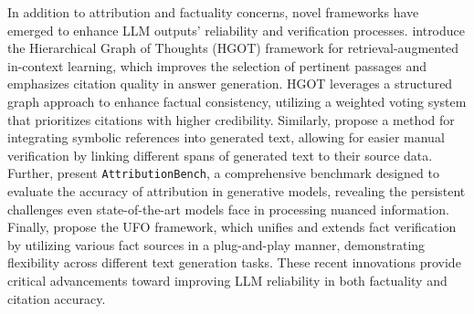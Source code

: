 In addition to attribution and factuality concerns, novel frameworks have emerged to enhance LLM outputs' reliability and verification processes. \cite{hgot2024} introduce the Hierarchical Graph of Thoughts (HGOT) framework for retrieval-augmented in-context learning, which improves the selection of pertinent passages and emphasizes citation quality in answer generation. HGOT leverages a structured graph approach to enhance factual consistency, utilizing a weighted voting system that prioritizes citations with higher credibility. Similarly, \cite{symbolic_references2023}\cite{feedback_learning2023}\cite{factscore2023} propose a method for integrating symbolic references into generated text, allowing for easier manual verification by linking different spans of generated text to their source data. Further, \cite{attribution_bench2024}\cite{verifiable_generation2023} present \texttt{AttributionBench}, a comprehensive benchmark designed to evaluate the accuracy of attribution in generative models, revealing the persistent challenges even state-of-the-art models face in processing nuanced information. Finally, \cite{ufo2024} propose the UFO framework, which unifies and extends fact verification by utilizing various fact sources in a plug-and-play manner, demonstrating flexibility across different text generation tasks\cite{responsible_lm2023}. These recent innovations provide critical advancements toward improving LLM reliability in both factuality and citation accuracy\cite{nonexistent_refs2024}.
